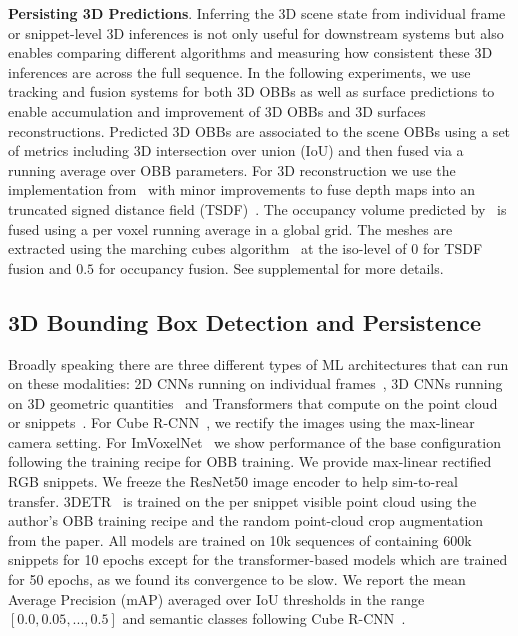 \noindent\textbf{Persisting 3D Predictions}.
Inferring the 3D scene state from individual frame or snippet-level 3D inferences is not only useful for downstream systems but also enables comparing different algorithms and measuring how consistent these 3D inferences are across the full sequence. 
In the following experiments, we use tracking and fusion systems for both 3D OBBs as well as surface predictions to enable accumulation and improvement of 3D OBBs and 3D surfaces reconstructions. Predicted 3D OBBs are associated to the scene OBBs using a set of metrics including 3D intersection over union (IoU) and then fused via a running average over OBB parameters. For 3D reconstruction we use the implementation from~\cite{zeng20163dmatch} with minor improvements to fuse depth maps into an truncated signed distance field (TSDF)~\cite{newcombe2011kinectfusion}. The occupancy volume predicted by~\EFMmodel{} is fused using a per voxel running average in a global grid. The meshes are extracted using the marching cubes algorithm~\cite{lorensen1998marching} at the iso-level of $0$ for TSDF fusion and $0.5$ for occupancy fusion.
See supplemental for more details.

\subsection{3D Bounding Box Detection and Persistence}

Broadly speaking there are three different types of ML architectures that can run on these modalities: 2D CNNs running on individual frames~\cite{Brazil_2023_CVPR}, 3D CNNs running on 3D geometric quantities~\cite{rukhovich2022imvoxelnet} and Transformers that compute on the point cloud~\cite{misra2021end} or snippets~\cite{Xie_2023_ICCV}.
%
For Cube R-CNN~\cite{Brazil_2023_CVPR}, we rectify the images using the max-linear camera setting.
%
For ImVoxelNet~\cite{rukhovich2022imvoxelnet} we show performance of the base configuration following the training recipe for OBB training. We provide max-linear rectified RGB snippets. 
We freeze the ResNet50 image encoder to help sim-to-real transfer.
%
3DETR~\cite{misra2021end} is trained on the per snippet visible point cloud using the author's OBB training recipe and the random point-cloud crop augmentation from the paper.
%
%
All models are trained on 10k sequences of \ASE{} containing 600k snippets for 10 epochs except for the transformer-based models which are trained for 50 epochs, as we found its convergence to be slow. We report the mean Average Precision (mAP) averaged over IoU thresholds in the range $[0.0, 0.05, ..., 0.5]$ and semantic classes following Cube R-CNN~\cite{Brazil_2023_CVPR}. 
%

